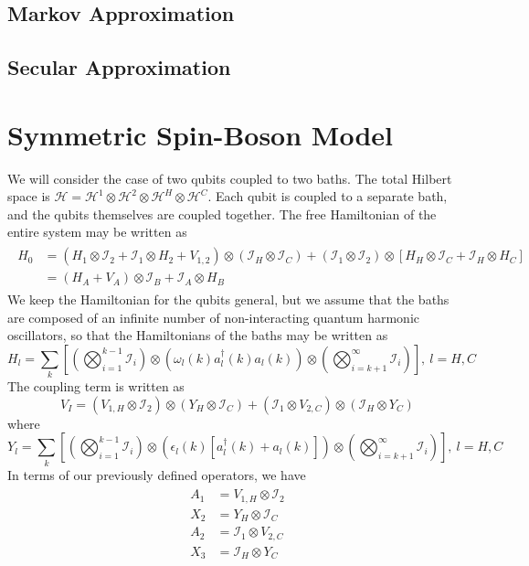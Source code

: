 \documentclass[aps, prl, preprint]{revtex4-1}
\newcommand{\ten}{\otimes}
\newcommand{\I}{\mathcal{I}}
\begin{document}
\subsection{Markov Approximation}






\subsection{Secular Approximation}





\section{Symmetric Spin-Boson Model}

We will consider the case of two qubits coupled to two baths. The total Hilbert space is $\mathcal{H} = \mathcal{H}^1\ten\mathcal{H}^2\ten\mathcal{H}^H\ten\mathcal{H}^C$. Each qubit is coupled to a separate bath, and the qubits themselves are coupled together. The free Hamiltonian of the entire system may be written as
\begin{align}\label{freeham}
\begin{split}
H_0 &= (H_1\ten \I_2 + \I_1\ten H_2 + V_{1,2})\ten(\I_H\ten \I_C) + (\I_1\ten \I_2)\ten\left[H_H\ten \I_C + \I_H\ten H_C\right]\\
&= (H_A+V_A)\ten \I_B + \I_A\ten H_B
\end{split}
\end{align}
We keep the Hamiltonian for the qubits general, but we assume that the baths are composed of an infinite number of non-interacting quantum harmonic oscillators, so that the Hamiltonians of the baths may be written as
\begin{equation}\label{bathham}
H_l = \sum_k\left[\left(\bigotimes_{i=1}^{k-1}\I_i\right)\ten\left(\omega_l(k) a_l^{\dag}(k)a_l(k)\right)\ten\left(\bigotimes_{i=k+1}^{\infty}\I_i\right)\right],\ l = H,C
\end{equation}
The coupling term is written as
\begin{equation}\label{modcoup}
V_I = \left(V_{1,H}\ten \I_2\right)\ten\left(Y_H\ten \I_C\right) + \left(\I_1\ten V_{2,C}\right)\ten\left(\I_H\ten Y_C\right)
\end{equation}
where
\begin{equation}\label{yl}
Y_l = \sum_k\left[\left(\bigotimes_{i=1}^{k-1}\I_i\right)\ten\left(\epsilon_l(k)\left[a_l^{\dag}(k) + a_l(k)\right]\right)\ten\left(\bigotimes_{i=k+1}^{\infty}\I_i\right)\right],\ l = H,C
\end{equation}
In terms of our previously defined operators, we have
\begin{align}\label{AXop}
\begin{split}
	A_1 &= V_{1,H}\ten \I_2\\
	X_2 &= Y_H\ten \I_C\\ 
	A_2 &= \I_1\ten V_{2,C}\\
	X_3 &= \I_H\ten Y_C
\end{split} 
\end{align}
\end{document}
